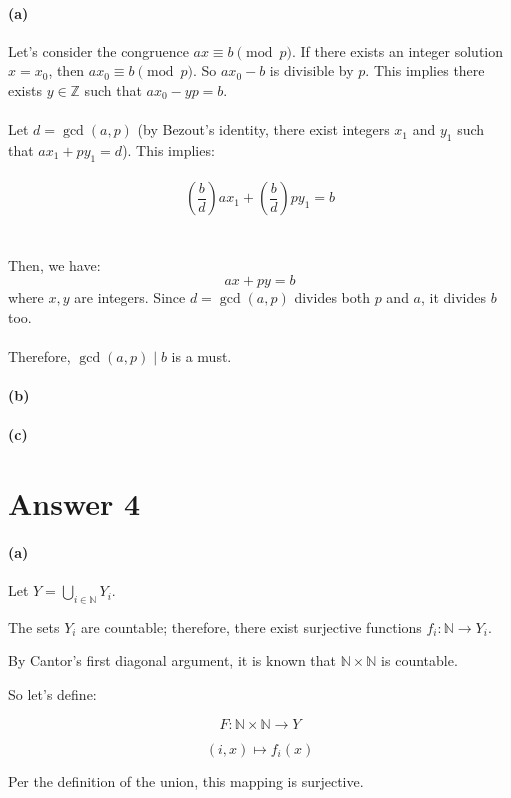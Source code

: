 \documentclass[12pt]{article}
\begin{document}
\paragraph{(a)}
Let's consider the congruence \(ax \equiv b \pmod{p}\). If there exists an integer solution \(x=x_0\), then \(ax_0 \equiv b \pmod{p}\). So \(ax_0 - b\) is divisible by \(p\). This implies there exists \(y \in \mathbb{Z}\) such that \(ax_0 - yp = b\).
\\ \\
Let \(d = \gcd(a, p)\) (by Bezout's identity, there exist integers \(x_1\) and \(y_1\) such that \(ax_1 + py_1 = d\)). This implies: 
\\ \\
\[\left(\frac{b}{d}\right)ax_1 + \left(\frac{b}{d}\right)py_1 = b \]
\\ \\
Then, we have:
\[ ax + py = b \]
where \(x, y\) are integers. Since \(d = \gcd(a, p)\) divides both \(p\) and \(a\), it divides \(b\) too. 
\\ \\
Therefore, \(\gcd(a, p) \mid b\) is a must.

\paragraph{(b)}
\paragraph{(c)}


\section*{Answer 4}
\paragraph{(a)}
Let \(Y = \bigcup_{i \in \mathbb{N}} Y_i\).

The sets \(Y_i\) are countable; therefore, there exist surjective functions \(f_i: \mathbb{N} \rightarrow Y_i\).

By Cantor's first diagonal argument, it is known that \(\mathbb{N} \times \mathbb{N}\) is countable.

So let's define:

\[ F: \mathbb{N} \times \mathbb{N} \rightarrow Y \]

\[ (i, x) \mapsto f_i(x) \]

Per the definition of the union, this mapping is surjective.
\end{document}
